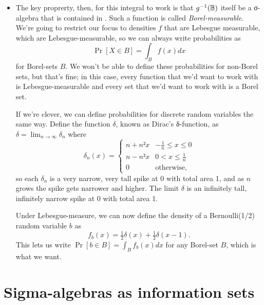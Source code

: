 \begin{itemize}
\item The key proprerty, then, for this integral to work is that
  $g^{-1}(\mathbb{B})$ itself be a σ-algebra that is contained in \BB.  Such
  a function is called \emph{Borel-measurable}.  We're going to
  restrict our focus to densities $f$ that are Lebesgue measurable,
  which are Lebesgue-measurable, so we can always write probabilities
  as
  \begin{equation*}
    \Pr[X ∈ B] = ∫_B f(x) dx
  \end{equation*}
  for Borel-sets $B$.  We won't be able to define these probabilities
  for non-Borel sets, but that's fine; in this case, every function
  that we'd want to work with is Lebesgue-measurable and every set
  that we'd want to work with is a Borel set.

  If we're clever, we can define probabilities for discrete random
  variables the same way.  Define the function $δ$, known as Dirac's
  δ-function, as $δ = \lim_{n → ∞} δ_n$ where
  \begin{equation*}
    δ_n(x) =
    \begin{cases}
      n + n² x & - \tfrac{1}{n} ≤ x ≤ 0 \\
      n - n² x & 0 < x ≤ \tfrac{1}{n} \\
      0        & \text{otherwise},
    \end{cases}
  \end{equation*}
  so each $δ_n$ is a very narrow, very tall spike at 0 with total area
  1, and as $n$ grows the spike gets narrower and higher.  The limit
  $δ$ is an infinitely tall, infinitely narrow spike at 0 with total
  area 1.

  Under Lebesgue-measure, we can now define the density of a
  Bernoulli(1/2) random variable $b$ as
  \begin{equation*}
    f_b(x) = \tfrac{1}{2} δ(x) + \tfrac{1}{2} δ(x - 1).
  \end{equation*}
  This lets us write $\Pr[b ∈ B] = ∫_B f_b(x) dx$ for any Borel-set
  $B$, which is what we want.
\end{itemize}

\section{Sigma-algebras as information sets}

